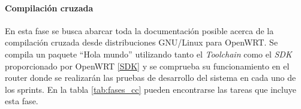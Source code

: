 \documentclass[12pt]{article}
\begin{document}
            \begin{table}[!htbp]             
                \centering                  
                \caption{Descripción de la face Boceto}
                \label{tab:fases_boc}
            \end{table}
            
            \paragraph{ Compilación cruzada}
            En esta fase se busca abarcar toda la documentación posible acerca de la compilación cruzada desde distribuciones GNU/Linux para OpenWRT. Se compila un paquete ``Hola mundo'' utilizando tanto el \textit{Toolchain} como el \textit{SDK} proporcionado por OpenWRT \ref{SDK} y se comprueba su funcionamiento en el router donde se realizarán las pruebas de desarrollo del sistema en cada uno de los sprints. En la tabla \ref{tab:fases_cc} pueden encontrarse las tareas que incluye esta fase.
\end{document}
